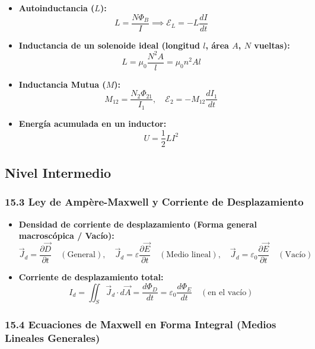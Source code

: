 \documentclass[11pt,a4paper]{article}
\begin{document}
\begin{itemize}
  \item \textbf{Autoinductancia ($L$):}
  \[
    L = \frac{N \Phi_B}{I} \implies \mathcal{E}_L = -L \frac{dI}{dt}
  \]
  \item \textbf{Inductancia de un solenoide ideal (longitud $l$, área $A$, $N$ vueltas):}
  \[
    L = \mu_0 \frac{N^2 A}{l} = \mu_0 n^2 A l
  \]
  \item \textbf{Inductancia Mutua ($M$):}
  \[
    M_{12} = \frac{N_2 \Phi_{21}}{I_1}, \quad \mathcal{E}_2 = -M_{12} \frac{dI_1}{dt}
  \]
  \item \textbf{Energía acumulada en un inductor:}
  \[
    U = \frac{1}{2} L I^2
  \]
\end{itemize}

\subsection*{Nivel Intermedio}

\subsubsection*{15.3 Ley de Ampère-Maxwell y Corriente de Desplazamiento}

\begin{itemize}
  \item \textbf{Densidad de corriente de desplazamiento (Forma general macroscópica / Vacío):}
  \[
    \vec{J}_d = \frac{\partial \vec{D}}{\partial t} \quad (\text{General}), \quad \vec{J}_d = \varepsilon \frac{\partial \vec{E}}{\partial t} \quad (\text{Medio lineal}), \quad \vec{J}_d = \varepsilon_0 \frac{\partial \vec{E}}{\partial t} \quad (\text{Vacío})
  \]
  \item \textbf{Corriente de desplazamiento total:}
  \[
    I_d = \iint_S \vec{J}_d \cdot d\vec{A} = \frac{d\Phi_D}{dt} = \varepsilon_0 \frac{d\Phi_E}{dt} \quad (\text{en el vacío})
  \]
\end{itemize}

\subsubsection*{15.4 Ecuaciones de Maxwell en Forma Integral (Medios Lineales Generales)}
\end{document}
